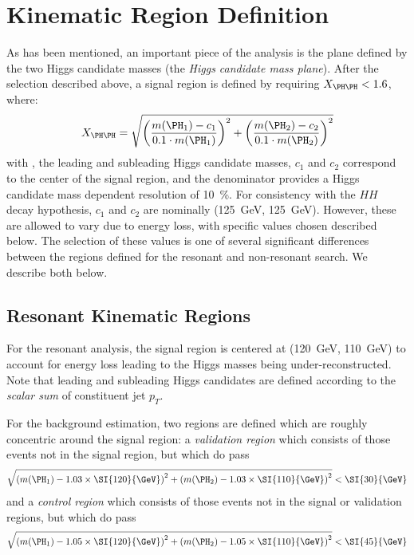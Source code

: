 \section{Kinematic Region Definition}
\label{sec:kinematic-reg}
As has been mentioned, an important piece of the analysis is the plane defined by the 
two Higgs candidate masses (the \emph{Higgs candidate mass plane}). After the selection
described above, a signal region is defined by requiring $X_{\higgs\higgs} < 1.6$, where:
\begin{equation}
	\label{eqn:xhh-def}
	X_{\higgs\higgs} = \sqrt{\qty(\frac{\mh1 - c_1}{0.1\cdot\mh1})^{2} + 
	\qty(\frac{\mh2 - c_2}{0.1\cdot\mh2})^{2}}
\end{equation}
with ,  the leading and subleading Higgs candidate masses, $c_{1}$ and $c_{2}$ correspond
to the center of the signal region, and the denominator provides a Higgs candidate mass 
dependent resolution of 10~\%. For consistency with the $HH$ decay hypothesis, $c_{1}$ and $c_{2}$
are nominally (\SI{125}{\GeV}, \SI{125}{\GeV}). However, these are allowed to vary due to 
energy loss, with specific values chosen described below. The selection of these values is 
one of several significant differences between the regions defined for the resonant and non-resonant search.
We describe both below.

\subsection{Resonant Kinematic Regions}
For the resonant analysis, the signal region is centered at (\SI{120}{\GeV}, \SI{110}{\GeV}) 
to account for energy loss leading to the Higgs masses being under-reconstructed. Note that leading and 
subleading Higgs candidates are defined according to the 
\emph{scalar sum} of constituent jet $p_{T}$.

For the background estimation, two regions are defined which are roughly concentric around the 
signal region: a \emph{validation region} which 
consists of those events not in the signal region, but which do pass
\begin{equation}
	\label{eqn:val-reg-def}
	\sqrt{\qty(\mh1 - 1.03 \times \SI{120}{\GeV})^{2} + \qty(\mh2 - 1.03 \times
		\SI{110}{\GeV})^{2}} < \SI{30}{\GeV}
\end{equation}
and a \emph{control region} which consists of those events not in the signal or validation
regions, but which do pass
\begin{equation}
	\label{eqn:ctrl-reg-def}
	\sqrt{\qty(\mh1 - 1.05 \times \SI{120}{\GeV})^{2} + \qty(\mh2 - 1.05 \times
		\SI{110}{\GeV})^{2}} < \SI{45}{\GeV}
\end{equation}

